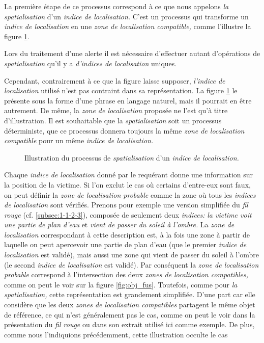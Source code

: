 La première étape de ce processus correspond à ce que nous appelons
\emph{la spatialisation} d'un \emph{indice de localisation.} C'est un
processus qui transforme un \emph{indice de localisation} en une
\emph{zone de localisation compatible,} comme l'illustre la figure
\ref{fig:obj_spa}.


Lors du traitement d'une alerte il est
nécessaire d'effectuer autant d'opérations de \emph{spatialisation}
qu'il y a \emph{d'indices de localisation} uniques.
%

Cependant, contrairement à ce que la figure laisse
supposer, \emph{l'indice de localisation} utilisé n'est pas contraint
dans sa représentation. La figure \ref{fig:obj_spa} le présente sous
la forme d'une phrase en langage naturel, mais il pourrait en être
autrement. De même, la \emph{zone de localisation} proposée ne l'est
qu'à titre d'illustration.
%
Il est souhaitable que la
\emph{spatialisation} soit un processus déterministe, \ie que ce
processus donnera toujours la même \emph{zone de localisation
  compatible} pour un même \emph{indice de localisation.}

\begin{figure}
  \centering
  
  \caption{Illustration du processus de \emph{spatialisation} d'un
    \emph{indice de localisation.}}
  \label{fig:obj_spa}
\end{figure}

Chaque \emph{indice de localisation} donné par le requérant donne une
information sur la position de la victime. Si l'on exclut le cas où
certains d'entre-eux sont faux, on peut définir la \emph{zone de
  localisation probable} comme la zone où tous les \emph{indices de
  localisation } sont vérifiés.
Prenons pour exemple une version simplifiée du \emph{fil rouge}
(cf. \autoref{subsec:1-1-2-3}), composée de seulement deux
\emph{indices:} \emph{la victime voit une partie de plan d'eau} et
\emph{vient de passer du soleil à l'ombre.}  La \emph{zone de
  localisation} correspondant à cette description est, à la fois une
zone à partir de laquelle on peut apercevoir une partie de plan d'eau
(\ie que le premier \emph{indice de localisation} est validé), mais
aussi une zone qui vient de passer du soleil à l'ombre (\ie le second
\emph{indice de localisation} est validé). Par conséquent la
\emph{zone de localisation probable} correspond à l'intersection des
deux \emph{zones de localisation compatibles,} comme on peut le voir
sur la figure \ref{fig:obj_fus}. Toutefois, comme pour \emph{la
  spatialisation,} cette représentation est grandement
simplifiée. D'une part car elle considère que les deux \emph{zones de
  localisation compatibles} partagent le même objet de référence, ce
qui n'est généralement pas le cas, comme on peut le voir dans la
présentation du \emph{fil rouge} ou dans son extrait utilisé ici comme
exemple. De plus, comme nous l'indiquions précédemment, cette
illustration occulte le cas 


